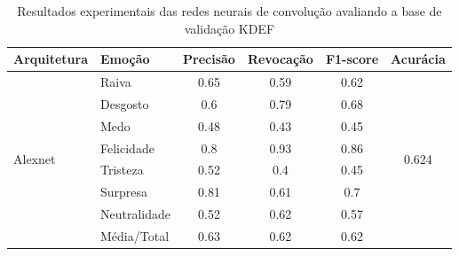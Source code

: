 \begin{table}[]
\centering
\caption{Resultados experimentais das redes neurais de convolução avaliando a base de validação KDEF}
\label{table:kdef}
\begin{tabular}{llcccc}
\hline
\textbf{Arquitetura}                   & \textbf{Emoção}       & \multicolumn{1}{l}{\textbf{Precisão}} & \multicolumn{1}{l}{\textbf{Revocação}} & \multicolumn{1}{l}{\textbf{F1-score}} & \multicolumn{1}{l}{\textbf{Acurácia}} \\ \hline
\multirow{8}{*}{Alexnet}         & Raiva                 & 0.65                                  & 0.59                                   & 0.62                                  & \multirow{8}{*}{0.624}                \\
                                       & Desgosto              & 0.6                                   & 0.79                                   & 0.68                                  &                                       \\
                                       & Medo                  & 0.48                                  & 0.43                                   & 0.45                                  &                                       \\
                                       & Felicidade            & 0.8                                   & 0.93                                   & 0.86                                  &                                       \\
                                       & Tristeza              & 0.52                                  & 0.4                                    & 0.45                                  &                                       \\
                                       & Surpresa              & 0.81                                  & 0.61                                   & 0.7                                   &                                       \\
                                       & Neutralidade          & 0.52                                  & 0.62                                   & 0.57                                  &                                       \\
                                       & Média/Total           & 0.63                                  & 0.62                                   & 0.62                                  &                                       \\ \hline

\end{tabular}
\end{table}
